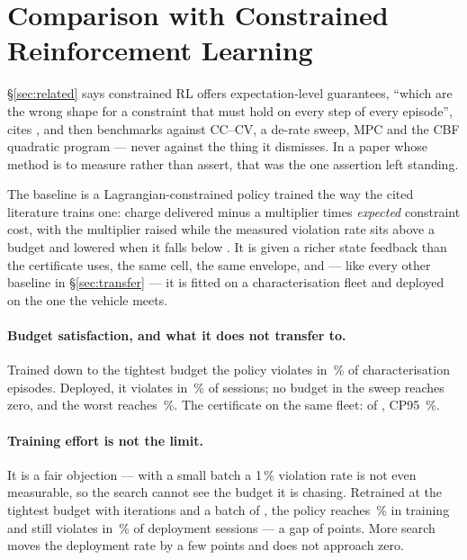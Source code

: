 \documentclass[11pt,letterpaper]{article}
\theoremstyle{definition}
\theoremstyle{remark}
\begin{document}
\section{Comparison with Constrained Reinforcement Learning}\label{sec:crl}

\S\ref{sec:related} says constrained RL offers expectation-level guarantees, ``which are the
wrong shape for a constraint that must hold on every step of every episode'', cites
\cite{achiam2017cpo,altman1999constrained}, and then benchmarks against CC--CV, a de-rate sweep,
MPC and the CBF quadratic program --- never against the thing it dismisses. In a paper whose
method is to measure rather than assert, that was the one assertion left standing.

The baseline is a Lagrangian-constrained policy trained the way the cited literature trains one:
charge delivered minus a multiplier times \emph{expected} constraint cost, with the multiplier
raised while the measured violation rate sits above a budget and lowered when it falls below
\cite{stooke2020pid}. It is given a richer state feedback than the certificate uses, the same
cell, the same envelope, and --- like every other baseline in \S\ref{sec:transfer} --- it is
fitted on a characterisation fleet and deployed on the one the vehicle meets.

\paragraph{Budget satisfaction, and what it does not transfer to.} Trained down to the tightest budget the
policy violates in \rlBestTrain\,\% of characterisation episodes. Deployed, it violates in
\rlBestDeploy\,\% of sessions; no budget in the sweep reaches zero, and the worst reaches
\rlWorst\,\%. The certificate on the same fleet: \rlZgViol{} of \rlTrials, CP95 \rlZgCP\,\%.

\paragraph{Training effort is not the limit.} It is
a fair objection --- with a small batch a 1\,\% violation rate is not even measurable, so the
search cannot see the budget it is chasing. Retrained at the tightest budget with
\rlHardIters{} iterations and a batch of \rlHardBatch, the policy reaches \rlHardTrain\,\% in
training and still violates in \rlHardDeploy\,\% of deployment sessions --- a gap of
\rlGapPoints{} points. More search moves the deployment rate by a few points and does not
approach zero.
\end{document}
